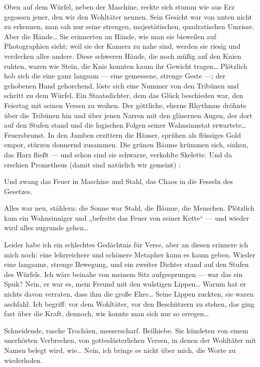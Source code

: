 Oben auf dem Würfel, neben der Maschine, reckte sich stumm wie aus
Erz gegossen jener, den wir den Wohltäter nennen. Sein Gesicht war
von unten nicht zu erkennen, man sah nur seine strengen,
majestätischen, quadratischen Umrisse. Aber die Hände\ldots{} Sie
erinnerten an Hände, wie man sie bisweilen auf Photographien sieht;
weil sie der Kamera zu nahe sind, werden sie riesig und verdecken
alles andere. Diese schweren Hände, die noch müßig auf den Knien
ruhten, waren wie Stein, die Knie konnten kaum ihr Gewicht
tragen\ldots{} Plötzlich hob sich die eine ganz langsam — eine
gemessene, strenge Geste —; der gehobenen Hand gehorchend, löste
sich eine Nummer von den Tribünen und schritt zu dem Würfel. Ein
Staatsdichter, dem das Glück beschieden war, den Feiertag mit
seinen Versen zu weihen. Der göttliche, eherne Rhythmus dröhnte
über die Tribünen hin und über jenen Narren mit den gläsernen
Augen, der dort auf den Stufen stand und die logischen Folgen
seiner Wahnsinnstat erwartete\ldots{} Feuersbrunst. In den Jamben
erzittern die Häuser, sprühen als flüssiges Gold empor, stürzen
donnernd zusammen. Die grünen Bäume krümmen sich, sinken, das Harz
fließt — und schon sind sie schwarze, verkohlte Skelette. Und da
erschien Prometheus (damit sind natürlich wir gemeint) :

Und zwang das Feuer in Maschine und Stahl, das Chaos in die Fesseln
des Gesetzes.

Alles war neu, stählern: die Sonne war Stahl, die Bäume, die
Menschen. Plötzlich kam ein Wahnsinniger und „befreite das Feuer
von seiner Kette“ — und wieder wird alles zugrunde gehen\ldots{}

Leider habe ich ein schlechtes Gedächtnis für Verse, aber an diesen
erinnere ich mich noch: eine lehrreichere und schönere Metapher
kann es kaum geben. Wieder eine langsame, strenge Bewegung, und ein
zweiter Dichter stand auf den Stufen des Würfels. Ich wäre beinahe
von meinem Sitz aufgesprungen — war das ein Spuk? Nein, er war es,
mein Freund mit den wulstigen Lippen\ldots{} Warum hat er nichts davon
verraten, dass ihm die große Ehre\ldots{} Seine Lippen zuckten, sie
waren aschfahl. Ich begriff: vor dem Wohltäter, vor den Beschützern
zu stehen, das ging fast über die Kraft, dennoch, wie konnte man
sich nur so erregen\ldots{}

Schneidende, rasche Trochäen, messerscharf. Beilhiebe. Sie kündeten
von einem unerhörten Verbrechen, von gotteslästerlichen Versen, in
denen der Wohltäter mit Namen belegt wird, wie\ldots{} Nein, ich bringe
es nicht über mich, die Worte zu wiederholen.

